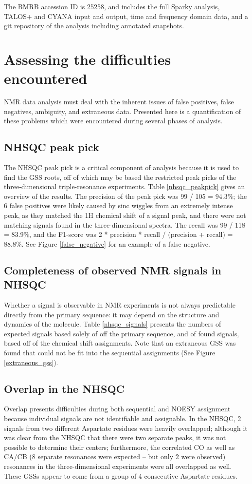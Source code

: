 The BMRB accession ID is 25258, and includes the full Sparky analysis, TALOS+
and CYANA input and output, time and frequency domain data, and a git 
repository of the analysis including annotated snapshots.


\section{Assessing the difficulties encountered}
NMR data analysis must deal with the inherent issues of false positives, false 
negatives, ambiguity, and extraneous data.
Presented here is a quantification of these problems which were encountered
during several phases of analysis.

\subsection*{NHSQC peak pick}
The NHSQC peak pick is a critical component of analysis because it is used
to find the GSS roots, off of which may be based the restricted peak picks of
the three-dimensional triple-resonance experiments.
Table \ref{nhsqc_peakpick} gives an overview of the results.
The precision of the peak pick was 99 / 105 = 94.3\%{}; the 6 false positives 
were likely caused by sinc wiggles from an extremely intense peak, as they
matched the 1H chemical shift of a signal peak, and there were not matching
signals found in the three-dimensional spectra.
The recall was 99 / 118 = 83.9\%{}, and the 
F1-score was 2 * precision * recall / (precision + recall) = 88.8\%{}.
See Figure \ref{false_negative} for an example of a false negative.

\subsection*{Completeness of observed NMR signals in NHSQC}
Whether a signal is observable in NMR experiments is not always predictable
directly from the primary sequence:  it may depend on the structure and
dynamics of the molecule.  Table \ref{nhsqc_signals} presents the numbers
of expected signals based solely of off the primary sequence, and of found 
signals, based off of the chemical shift assignments.  Note that an 
extraneous GSS was found that could not be fit into the sequential assignments
(See Figure \ref{extraneous_gss}).

\subsection*{Overlap in the NHSQC}
Overlap presents difficulties during both sequential and NOESY assignment
because individual signals are not identifiable and assignable.
In the NHSQC, 2 signals from two different Aspartate residues were heavily
overlapped; although it was clear from the NHSQC that there were two separate
peaks, it was not possible to determine their centers; furthermore, the
correlated CO as well as CA/CB (8 separate resonances were expected -- but 
only 2 were observed) resonances in the three-dimensional experiments were all
overlapped as well.  These GSSs appear to come from a group of 4 consecutive
Aspartate residues.

